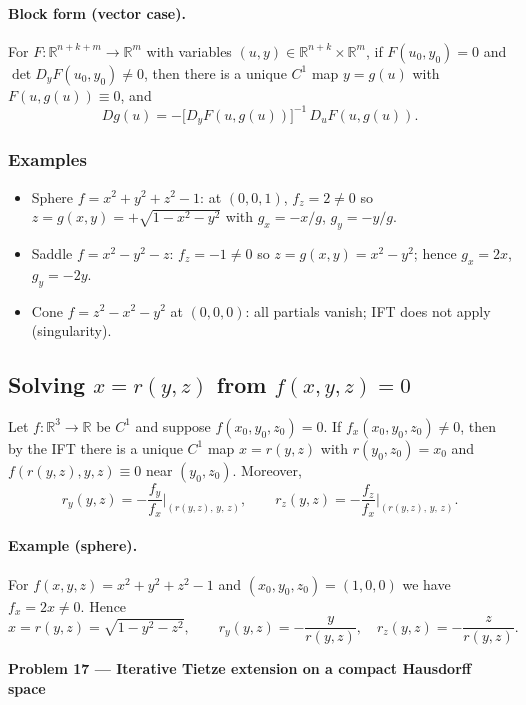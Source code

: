 \documentclass[12pt,a4paper]{article}
\theoremstyle{plain}
\theoremstyle{definition}
\theoremstyle{remark}
\theoremstyle{remark}
\newcommand{\probheader}[1]{%
	\par\vspace{8pt}%
	{\Large\bfseries #1\par}%
	\vspace{6pt}%
}
\begin{document}
	\paragraph{Block form (vector case).}
	For $F:\mathbb R^{n+k+m}\to\mathbb R^m$ with variables $(u,y)\in\mathbb R^{n+k}\times\mathbb R^{m}$,
	if $F(u_0,y_0)=0$ and $\det D_y F(u_0,y_0)\neq 0$, then there is a unique $C^1$ map
	$y=g(u)$ with $F(u,g(u))\equiv 0$, and
	\[
	Dg(u)= -\big[D_y F(u,g(u))\big]^{-1}\,D_u F(u,g(u)).
	\]
	
	\subsubsection*{Examples}
	\begin{itemize}
		\item Sphere $f=x^2+y^2+z^2-1$: at $(0,0,1)$, $f_z=2\ne0$ so $z=g(x,y)=+\sqrt{1-x^2-y^2}$ with
		$g_x=-x/g$, $g_y=-y/g$.
		\item Saddle $f=x^2-y^2-z$: $f_z=-1\ne0$ so $z=g(x,y)=x^2-y^2$; hence $g_x=2x$, $g_y=-2y$.
		\item Cone $f=z^2-x^2-y^2$ at $(0,0,0)$: all partials vanish; IFT does not apply (singularity).
	\end{itemize}
	
	\subsection*{Solving $x=r(y,z)$ from $f(x,y,z)=0$}
	
	Let \(f:\mathbb{R}^3\to\mathbb{R}\) be \(C^1\) and suppose \(f(x_0,y_0,z_0)=0\).
	If \(f_x(x_0,y_0,z_0)\neq 0\), then by the IFT there is a unique \(C^1\) map
	\(x = r(y,z)\) with \(r(y_0,z_0)=x_0\) and \(f(r(y,z),y,z)\equiv 0\) near \((y_0,z_0)\).
	Moreover,
	\[
	r_y(y,z)= -\frac{f_y}{f_x}\Big|_{(r(y,z),\,y,\,z)},
	\qquad
	r_z(y,z)= -\frac{f_z}{f_x}\Big|_{(r(y,z),\,y,\,z)}.
	\]
	
	\paragraph{Example (sphere).}
	For \(f(x,y,z)=x^2+y^2+z^2-1\) and \((x_0,y_0,z_0)=(1,0,0)\) we have \(f_x=2x\neq0\).
	Hence
	\[
	x=r(y,z)=\sqrt{1-y^2-z^2},
	\qquad
	r_y(y,z)=-\frac{y}{r(y,z)},\quad r_z(y,z)=-\frac{z}{r(y,z)}.
	\]
	
	\probheader{Problem 17 — Iterative Tietze extension on a compact Hausdorff space}
	
\end{document}
